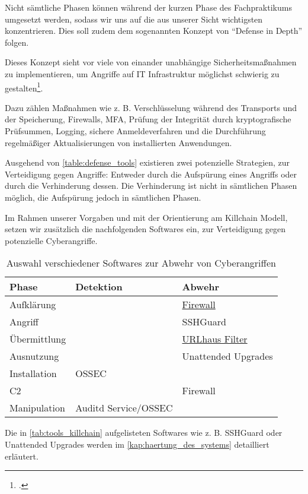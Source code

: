
Nicht sämtliche Phasen können während der kurzen Phase des Fachpraktikums umgesetzt werden, sodass wir uns auf die aus unserer Sicht wichtigsten konzentrieren. Dies soll zudem dem sogenannten Konzept von \enquote{Defense in Depth} folgen.

Dieses Konzept sieht vor viele von einander unabhängige Sicherheitsmaßnahmen zu implementieren, um Angriffe auf IT Infrastruktur möglichst schwierig zu gestalten\footcite[Vgl.][]{barbu2015defense}.

Dazu zählen Maßnahmen wie z. B. Verschlüsselung während des Transports und der Speicherung, Firewalls, \ac{MFA}, Prüfung der Integrität durch kryptografische Prüfsummen, Logging, sichere Anmeldeverfahren und die Durchführung regelmäßiger Aktualisierungen von installierten Anwendungen.

Ausgehend von \autoref{table:defense_tools} existieren zwei potenzielle Strategien, zur Verteidigung gegen Angriffe: Entweder durch die Aufspürung eines Angriffs oder durch die Verhinderung dessen. Die Verhinderung ist nicht in sämtlichen Phasen möglich, die Aufspürung jedoch in sämtlichen Phasen.

Im Rahmen unserer Vorgaben und mit der Orientierung am Killchain Modell, setzen wir zusätzlich die nachfolgenden Softwares ein, zur Verteidigung gegen potenzielle Cyberangriffe.

\begin{table}[ht]
    \begin{center}
        \begin{tabular}{|l|l|l|}
            \hline
            Phase        & Detektion      & Abwehr        \\ \hline
            Aufklärung   &                & \href{https://feodotracker.abuse.ch/blocklist/}{Firewall}            \\ \hline
            Angriff      &                & SSHGuard            \\ \hline
            Übermittlung &                & \href{https://gitlab.com/malware-filter/urlhaus-filter}{URLhaus Filter}     \\ \hline
            Ausnutzung   &                & Unattended Upgrades \\ \hline
            Installation & OSSEC          &                     \\ \hline
            C2           &                & Firewall            \\ \hline
            Manipulation & Auditd Service/OSSEC &                     \\ \hline
        \end{tabular}
    \end{center}
    \caption{Auswahl verschiedener Softwares zur Abwehr von Cyberangriffen}
    \label{tab:tools_killchain}
\end{table}

Die in \autoref{tab:tools_killchain} aufgelisteten Softwares wie z. B. SSHGuard oder Unattended Upgrades werden im \autoref{kap:haertung_des_systems} detailliert erläutert.